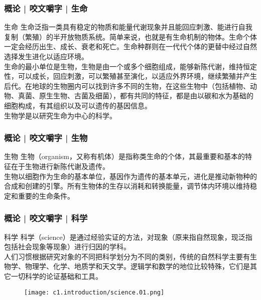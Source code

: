 \begin{frame}
  \frametitle{概论 | 咬文嚼字 | 生命}
  \begin{block}{生命}
生命泛指一类具有稳定的物质和能量代谢现象并且能回应刺激、能进行自我复制（繁殖）的半开放物质系统。简单来说，也就是有生命机制的物体。生命个体一定会经历出生、成长、衰老和死亡。生命种群则在一代代个体的更替中经过自然选择发生进化以适应环境。\\
    \vspace{1em}
生命的最小单位是生物，生物是由一个或多个细胞组成，能够新陈代谢，维持恒定性，可以成长，回应刺激，可以繁殖甚至演化，以适应外界环境，继续繁殖并产生后代。在地球的生物圈内可以找到许多不同的生物，在这些生物中（包括植物、动物、真菌、原生生物、古菌及细菌），都有共同的特征，都是由以碳和水为基础的细胞构成，有其组织以及可以遗传的基因信息。\\
    \vspace{1em}
生物学是以研究生命为中心的科学。 
  \end{block}
\end{frame}

\begin{frame}[t]
  \frametitle{概论 | 咬文嚼字 | 生物}
  \begin{block}{生物}
    生物（organism，又称有机体）是指称类生命的个体，其最重要和基本的特征在于生物进行新陈代谢及遗传。\\
生物以细胞作为生命的基本单位，基因作为遗传的基本单元，进化是推动新物种的合成和创建的引擎。所有生物体的生存以消耗和转换能量，调节体内环境以维持稳定和重要的生命条件。
  \end{block}
  \begin{figure}
    \centering
    \qquad
  \end{figure}
\end{frame}

\begin{frame}
  \frametitle{概论 | 咬文嚼字 | 科学}
  \begin{block}{科学}
    科学（science）是通过经验实证的方法，对现象（原来指自然现象，现泛指包括社会现象等现象）进行归因的学科。\\
    \vspace{1em}
人们习惯根据研究对象的不同把科学划分为不同的类别，传统的自然科学主要有生物学、物理学、化学、地质学和天文学。逻辑学和数学的地位比较特殊，它们是其它一切科学的论证基础和工具。
  \end{block}
  \begin{figure}
    \centering
    \texttt{[image: c1.introduction/science.01.png]}
  \end{figure}
\end{frame}

